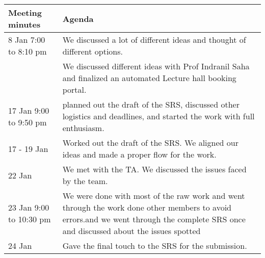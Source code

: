 \documentclass[a4paper,12pt]{article}
\begin{document}
\begin{table}[h!]
\centering
\begin{tabular}{|m{4cm}|m{10cm}|}
\hline
\textbf{Meeting minutes} & \textbf{Agenda} \\ \hline
8 Jan 7:00 to 8:10 pm & We discussed a lot of different ideas and thought of different options. \\ \hline
& We discussed different ideas with Prof Indranil Saha and finalized an automated Lecture hall booking portal. \\ \hline
17 Jan 9:00 to 9:50 pm& planned out the draft of the SRS, discussed other logistics and deadlines, and started the work with full enthusiasm. \\ \hline
17 - 19 Jan & Worked out the draft of the SRS. We aligned our ideas and made a proper flow for the work.  \\ \hline
22 Jan & We met with the TA. We discussed the issues faced by the team. \\ \hline
23 Jan 9:00 to 10:30 pm & We were done with most of the raw work and went through the work done other members to avoid errors.and we went through the complete SRS once and discussed about the issues spotted\\ \hline
24 Jan& Gave the final touch to the SRS for the submission. \\ \hline

\end{tabular}
\end{table}
\end{document}

